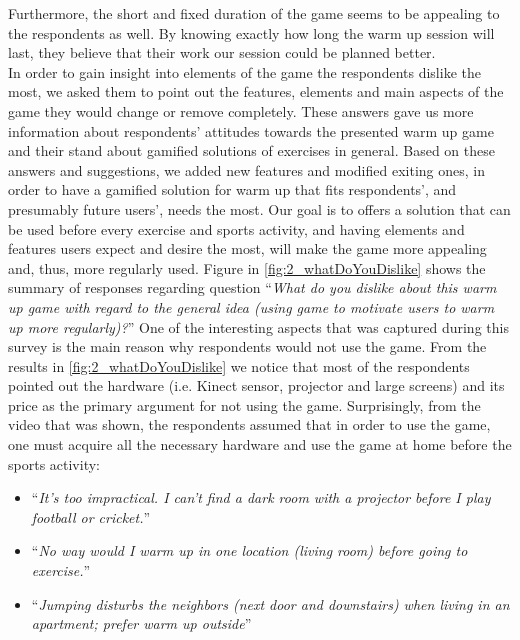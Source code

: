 Furthermore, the short and fixed duration of the game seems to be appealing to the respondents as well. By knowing exactly how long the warm up session will last, they believe that their work our session could be planned better.\\
In order to gain insight into elements of the game the respondents dislike the most, we asked them to point out the features, elements and main aspects of the game they would change or remove completely. These answers gave us more information about respondents' attitudes towards the presented warm up game and their stand about gamified solutions of exercises in general. Based on these answers and suggestions, we added new features and modified exiting ones, in order to have a gamified solution for warm up that fits respondents', and presumably future users', needs the most. Our goal is to offers a solution that can be used before every exercise and sports activity, and having elements and features users expect and desire the most, will make the game more appealing and, thus, more regularly used.
Figure in \ref{fig:2_whatDoYouDislike} shows the summary of responses regarding question ``\textit{What do you dislike about this warm up game with regard to the general idea (using game to motivate users to warm up more regularly)?}''
One of the interesting aspects that was captured during this survey is the main reason why respondents would not use the game. From the results in \ref{fig:2_whatDoYouDislike} we notice that most of the respondents pointed out the hardware (i.e. Kinect sensor, projector and large screens) and its price as the primary argument for not using the game. Surprisingly, from the video that was shown, the respondents assumed that in order to use the game, one must acquire all the necessary hardware and use the game at home before the sports activity:
\begin{itemize}
\item ``\textit{It's too impractical. I can't find a dark room with a projector before I play football or cricket.}''
\item ``\textit{No way would I warm up in one location (living room) before going to exercise.}''
\item ``\textit{Jumping disturbs the neighbors (next door and downstairs) when living in an apartment; prefer warm up outside}''
\end{itemize} 
